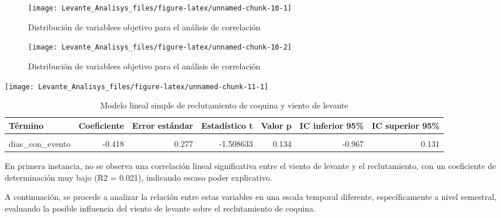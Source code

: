 \documentclass[
]{article}
\begin{document}
\begin{figure}

{\centering \texttt{[image: Levante\_Analisys\_files/figure-latex/unnamed-chunk-10-1]} 

}

\caption{Distribución de variablees objetivo para el análisis de correlación}\label{fig:unnamed-chunk-10-1}
\end{figure}
\begin{figure}

{\centering \texttt{[image: Levante\_Analisys\_files/figure-latex/unnamed-chunk-10-2]} 

}

\caption{Distribución de variablees objetivo para el análisis de correlación}\label{fig:unnamed-chunk-10-2}
\end{figure}

\begin{center}\texttt{[image: Levante\_Analisys\_files/figure-latex/unnamed-chunk-11-1]} \end{center}

\begin{table}[!h]
\centering
\caption{\label{tab:unnamed-chunk-13}Modelo lineal simple de reclutamiento de coquina y viento de levante}
\centering
\begin{tabular}[t]{l|r|r|r|r|r|r}
\hline
Término & Coeficiente & Error estándar & Estadístico t & Valor p & IC inferior 95\% & IC superior 95\%\\
\hline
\cellcolor{gray!10}{(Intercept)} & \cellcolor{gray!10}{24.657} & \cellcolor{gray!10}{2.644} & \cellcolor{gray!10}{9.323810} & \cellcolor{gray!10}{0.000} & \cellcolor{gray!10}{19.413} & \cellcolor{gray!10}{29.901}\\
\hline
dias\_con\_evento & -0.418 & 0.277 & -1.508633 & 0.134 & -0.967 & 0.131\\
\hline
\end{tabular}
\end{table}

En primera instancia, no se observa una correlación lineal significativa entre el viento de levante y el reclutamiento, con un coeficiente de determinación muy bajo (R2 = 0.021), indicando escaso poder explicativo.

A continuación, se procede a analizar la relación entre estas variables en una escala temporal diferente, específicamente a nivel semestral, evaluando la posible influencia del viento de levante sobre el reclutamiento de coquina.
\end{document}
